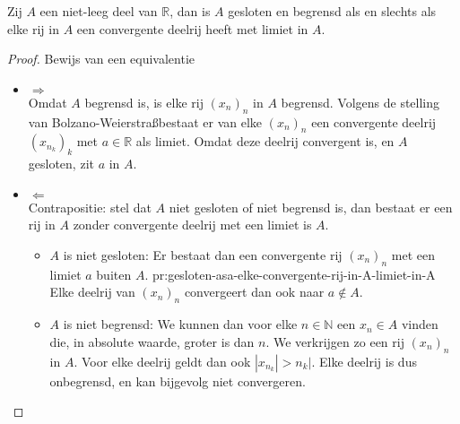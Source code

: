\documentclass[main.tex]{subfiles}
\begin{document}
\begin{bpr}
  Zij $A$ een niet-leeg deel van $\mathbb{R}$, dan is $A$ gesloten en begrensd als en slechts als elke rij in $A$ een convergente deelrij heeft met limiet in $A$.

  \begin{proof}
    Bewijs van een equivalentie\\
    \begin{itemize}
    \item $\Rightarrow$\\
      Omdat $A$ begrensd is, is elke rij $(x_{n})_{n}$ in $A$ begrensd.
      Volgens de stelling van Bolzano-Weierstra\ss bestaat er van elke $(x_{n})_{n}$ een convergente deelrij $(x_{n_{k}})_{k}$ met $a \in \mathbb{R}$ als limiet.
      Omdat deze deelrij convergent is, en $A$ gesloten, zit $a$ in $A$.
      
    \item $\Leftarrow$\\
      Contrapositie: stel dat $A$ niet gesloten of niet begrensd is, dan bestaat er een rij in $A$ zonder convergente deelrij met een limiet is $A$.
      \begin{itemize}
      \item $A$ is niet gesloten:
        Er bestaat dan een convergente rij $(x_{n})_{n}$ met een limiet $a$ buiten $A$. {pr:gesloten-asa-elke-convergente-rij-in-A-limiet-in-A}
        Elke deelrij van $(x_{n})_{n}$ convergeert dan ook naar $a\not\in A$.
      \item $A$ is niet begrensd:
        We kunnen dan voor elke $n\in \mathbb{N}$ een $x_{n}\in A$ vinden die, in absolute waarde, groter is dan $n$.
        We verkrijgen zo een rij $(x_{n})_{n}$ in $A$.
        Voor elke deelrij geldt dan ook $|x_{n_{k}}| > n_{k}|$.
        Elke deelrij is dus onbegrensd, en kan bijgevolg niet convergeren.
      \end{itemize}
    \end{itemize}
  \end{proof}
\end{bpr}
\end{document}
